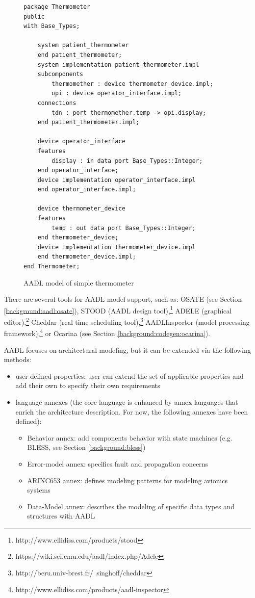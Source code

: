 \begin{figure}[ht]
\singlespacing
\begin{lstlisting}[language=aadl, frame=single, gobble=0]
package Thermometer
public 
with Base_Types;

	system patient_thermometer
	end patient_thermometer;
	system implementation patient_thermometer.impl
	subcomponents
		thermomether : device thermometer_device.impl;
		opi : device operator_interface.impl;
	connections
		tdn : port thermomether.temp -> opi.display;
	end patient_thermometer.impl;

	device operator_interface
	features
		display : in data port Base_Types::Integer;
	end operator_interface;
	device implementation operator_interface.impl
	end operator_interface.impl;

	device thermometer_device
	features
		temp : out data port Base_Types::Integer;
	end thermometer_device;
	device implementation thermometer_device.impl
	end thermometer_device.impl;
end Thermometer;
\end{lstlisting} 
\doublespacing
\caption{AADL model of simple thermometer}
\label{listing:patient_thermometer}
\end{figure}

There are several tools for AADL model support, such as: OSATE (see Section \ref{background:aadl:osate}), STOOD (AADL design tool),\footnote{http://www.ellidiss.com/products/stood} ADELE (graphical editor),\footnote{https://wiki.sei.cmu.edu/aadl/index.php/Adele} Cheddar (real time scheduling tool),\footnote{http://beru.univ-brest.fr/~singhoff/cheddar} AADLInspector (model processing framework),\footnote{http://www.ellidiss.com/products/aadl-inspector} or Ocarina (see Section \ref{background:codegen:ocarina}).

AADL focuses on architectural modeling, but it can be extended via the following methods:
\begin{itemize}
	\item user-defined properties: user can extend the set of applicable properties and add their own to specify their own requirements
	\item {language annexes (the core language is enhanced by annex languages that enrich the architecture description. For now, the following annexes have been defined):
		\begin{itemize}
			\item Behavior annex: add components behavior with state machines (e.g. BLESS, see Section \ref{background:bless})
			\item Error-model annex: specifies fault and propagation concerns
			\item ARINC653 annex: defines modeling patterns for modeling avionics systems
			\item Data-Model annex: describes the modeling of specific data types and structures with AADL
		\end{itemize}
		}
\end{itemize}

